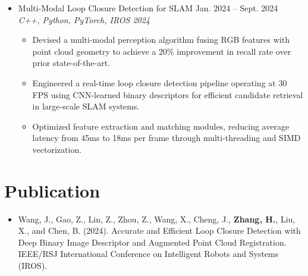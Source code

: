 \documentclass[letterpaper,11pt]{article}
\begin{document}
\begin{itemize}[leftmargin=0.15in, label={}]
    \item{
        Multi-Modal Loop Closure Detection for SLAM \hfill Jan. 2024 -- Sept. 2024 \\ \emph{C++, Python, PyTorch, IROS 2024}
        \begin{itemize}[leftmargin=0.25in, label={$\bullet$}]
            \item Devised a multi-modal perception algorithm fusing RGB features with point cloud geometry to achieve a 20\% improvement in recall rate over prior state-of-the-art.
            \item Engineered a real-time loop closure detection pipeline operating at 30 FPS using CNN-learned binary descriptors for efficient candidate retrieval in large-scale SLAM systems.
            \item Optimized feature extraction and matching modules, reducing average latency from 45ms to 18ms per frame through multi-threading and SIMD vectorization.
        \end{itemize}
    }
\end{itemize}

\section{Publication}
\begin{itemize}[leftmargin=0.15in, label={}]
    \item{
        Wang, J., Gao, Z., Lin, Z., Zhou, Z., Wang, X., Cheng, J., \textbf{Zhang, H.}, Liu, X., and Chen, B. (2024). Accurate and Efficient Loop Closure Detection with Deep Binary Image Descriptor and Augmented Point Cloud Registration. IEEE/RSJ International Conference on Intelligent Robots and Systems (IROS).
    }
\end{itemize}
\end{document}
